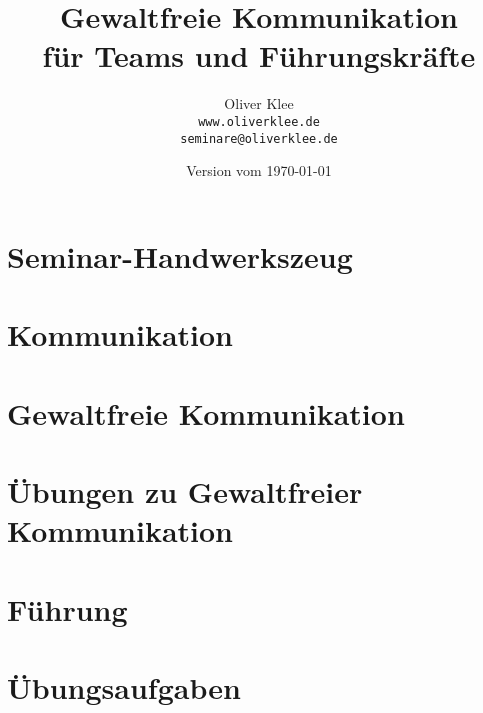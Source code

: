 \documentclass[a4paper,openany,twoside,titlepage,10pt,headsepline]{scrbook}
\title{Gewaltfreie Kommunikation\\für Teams und Führungskräfte}
\author{Oliver Klee\\\texttt{www.oliverklee.de}\\\texttt{seminare@oliverklee.de}}
\date{Version vom \today}
\begin{document}
\frontmatter

\maketitle

\tableofcontents


\mainmatter

\chapter{Seminar-Handwerkszeug}





\chapter{Kommunikation}






\chapter{Gewaltfreie Kommunikation}


















\chapter{Übungen zu Gewaltfreier Kommunikation}



\chapter{Führung}







\chapter{Übungsaufgaben}


\backmatter





\printindex
\end{document}
